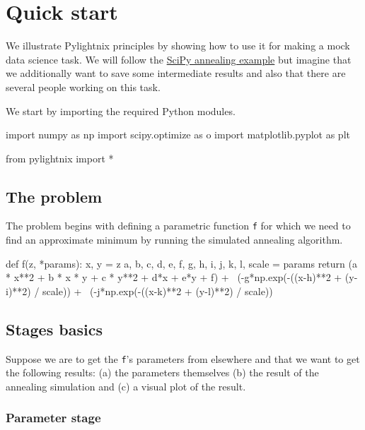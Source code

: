 \section{Quick start}

We illustrate Pylightnix principles by showing how to use it for making a mock
data science task. We will follow the
\href{https://docs.scipy.org/doc/scipy/reference/generated/scipy.optimize.dual_annealing.html}{SciPy
annealing example} but imagine that we additionally want to save some intermediate results
and also that there are several people working on this task.

We start by importing the required Python modules.

\begin{pythontexcode}
import numpy as np
import scipy.optimize as o
import matplotlib.pyplot as plt

from pylightnix import *
\end{pythontexcode}

\subsection{The problem}

The problem begins with defining a parametric function \texttt{f} for which we
need to find an approximate minimum by running the simulated annealing
algorithm.

\begin{pythontexcode}
def f(z, *params):
    x, y = z
    a, b, c, d, e, f, g, h, i, j, k, l, scale = params
    return (a * x**2 + b * x * y + c * y**2 + d*x + e*y + f) + \
           (-g*np.exp(-((x-h)**2 + (y-i)**2) / scale)) + \
           (-j*np.exp(-((x-k)**2 + (y-l)**2) / scale))
\end{pythontexcode}

\subsection{Stages basics}

Suppose we are to get the \texttt{f}'s parameters from elsewhere and
that we want to get the following results: (a) the parameters themselves (b)
the result of the annealing simulation and (c) a visual plot of the result.

\subsubsection{Parameter stage}

